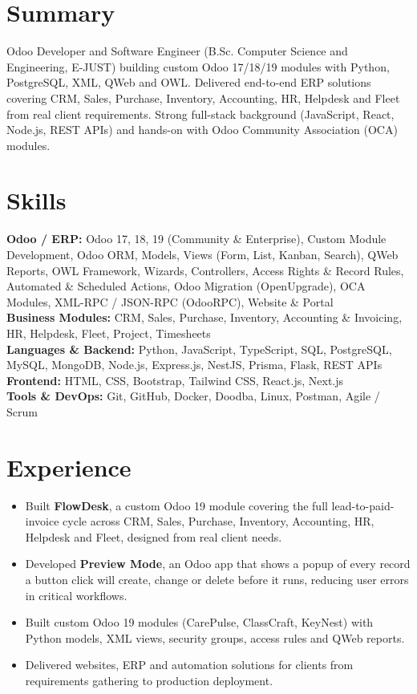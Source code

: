 


\section{Summary}
Odoo Developer and Software Engineer (B.Sc. Computer Science and Engineering, E-JUST) building custom Odoo 17/18/19 modules with Python, PostgreSQL, XML, QWeb and OWL. Delivered end-to-end ERP solutions covering CRM, Sales, Purchase, Inventory, Accounting, HR, Helpdesk and Fleet from real client requirements. Strong full-stack background (JavaScript, React, Node.js, REST APIs) and hands-on with Odoo Community Association (OCA) modules.

\section{Skills}
\textbf{Odoo / ERP:} Odoo 17, 18, 19 (Community \& Enterprise), Custom Module Development, Odoo ORM, Models, Views (Form, List, Kanban, Search), QWeb Reports, OWL Framework, Wizards, Controllers, Access Rights \& Record Rules, Automated \& Scheduled Actions, Odoo Migration (OpenUpgrade), OCA Modules, XML-RPC / JSON-RPC (OdooRPC), Website \& Portal\\
\textbf{Business Modules:} CRM, Sales, Purchase, Inventory, Accounting \& Invoicing, HR, Helpdesk, Fleet, Project, Timesheets\\
\textbf{Languages \& Backend:} Python, JavaScript, TypeScript, SQL, PostgreSQL, MySQL, MongoDB, Node.js, Express.js, NestJS, Prisma, Flask, REST APIs\\
\textbf{Frontend:} HTML, CSS, Bootstrap, Tailwind CSS, React.js, Next.js\\
\textbf{Tools \& DevOps:} Git, GitHub, Docker, Doodba, Linux, Postman, Agile / Scrum

\section{Experience}
\begin{itemize}
  \item Built \textbf{FlowDesk}, a custom Odoo 19 module covering the full lead-to-paid-invoice cycle across CRM, Sales, Purchase, Inventory, Accounting, HR, Helpdesk and Fleet, designed from real client needs.
  \item Developed \textbf{Preview Mode}, an Odoo app that shows a popup of every record a button click will create, change or delete before it runs, reducing user errors in critical workflows.
  \item Built custom Odoo 19 modules (CarePulse, ClassCraft, KeyNest) with Python models, XML views, security groups, access rules and QWeb reports.
  \item Delivered websites, ERP and automation solutions for clients from requirements gathering to production deployment.
\end{itemize}

